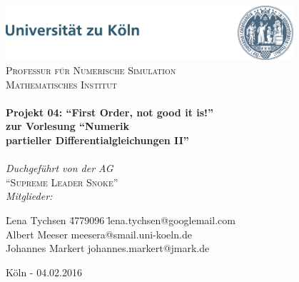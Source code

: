 \newcommand{\expNr}{04}
\newcommand{\expTitle}{}
\newcommand{\releaseDate}{04.02.2016}
\newcommand{\projectName}{First Order, not good it is!}
\newcommand{\groupName}{Supreme Leader Snoke}

\begin{titlepage}
\begin{center}

\includegraphics[width=0.8\textwidth]{./frp/uni_koeln_logo.jpg}\\[1.0cm]  

\textsc{\LARGE Professur für Numerische Simulation}
\textsc{\Large }\\[0.8cm]
\textsc{\Large Mathematisches Institut}\\[0.5cm]

\HRule \\[0.7cm]
{ \LARGE \bfseries Projekt \expNr: \textquotedblleft\projectName\textquotedblright}\\[0.4cm]
{ \LARGE \bfseries zur Vorlesung \textquotedblleft Numerik \\[0.4cm] 
    partieller Differentialgleichungen II\textquotedblright}\\[0.4cm]
\HRule \\[0.7cm]

\large \emph{Duchgeführt von der AG}\\[0.4cm]
\textsc{\LARGE \textquotedblleft\groupName\textquotedblright}\\[1cm]

\large \emph{Mitglieder:}\\[0.8cm]
\begin{tabbing}
\hspace{1.9cm}\=Lena Tychsen \hspace{1cm}\= 4779096 \hspace{1cm}\= lena.tychsen@googlemail.com\\[0.4cm]
\>Albert Meeser  \> meesera@smail.uni-koeln.de\\[0.4cm]
\>Johannes Markert  \> johannes.markert@jmark.de
\end{tabbing}

\vfill
K\"oln - \releaseDate 

\end{center}
\end{titlepage}


\cleardoubleemptypage

